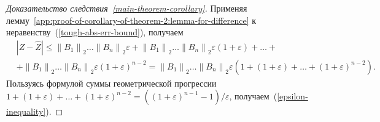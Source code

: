 \begin{proof}[Доказательство следствия~\ref{main-theorem-corollary}]
Применяя лемму~\ref{app:proof-of-corollary-of-theorem-2:lemma-for-difference} к неравенству~(\ref{tough-abs-err-bound}), получаем
\begin{align*}
&|Z - \widehat{Z}| \leq \left\| B_1 \right\|_2 \ldots \left\| B_n \right\|_2 \varepsilon +
\left\| B_1 \right\|_2 \ldots \left\| B_n \right\|_2 \varepsilon (1 + \varepsilon) + \ldots + \\
&+ \left\| B_1 \right\|_2 \ldots \left\| B_n \right\|_2 \varepsilon (1 + \varepsilon)^{n - 2} =
\left\| B_1 \right\|_2 \ldots \left\| B_n \right\|_2 \varepsilon (1 + (1 + \varepsilon) + \ldots + (1 + \varepsilon)^{n - 2}).
\end{align*}
Пользуясь формулой суммы геометрической прогрессии $1 + (1 + \varepsilon) + \ldots + (1 + \varepsilon)^{n - 2} = ((1 + \varepsilon)^{n - 1} - 1) / \varepsilon$, получаем~(\ref{epsilon-inequality}).
\end{proof}
